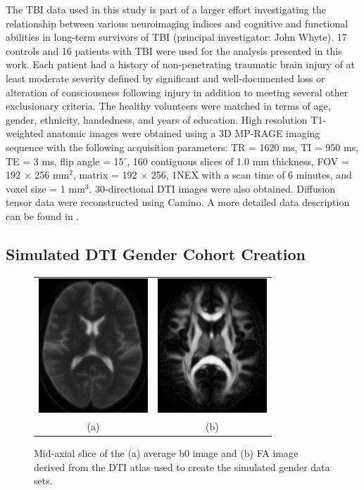 \documentclass[final,5p,times,twocolumn]{elsarticle}
\begin{document}
The TBI data used in this study is part of a larger effort investigating the relationship between various neuroimaging indices and cognitive and functional abilities in long-term survivors of TBI (principal investigator: John Whyte). 
17 controls and 16 patients with TBI were used for the analysis presented in this work.  Each patient had a history of non-penetrating traumatic brain injury 
of at least moderate severity defined by significant and well-documented
loss or alteration of consciousness following injury in addition to meeting
several other exclusionary criteria.  The healthy volunteers were matched in terms of age, gender, ethnicity, handedness, and years of education.
High resolution T1-weighted anatomic images were obtained using a 3D MP-RAGE 
imaging sequence with the following acquisition parameters: TR = 1620 ms, 
TI = 950 ms, TE = 3 ms, flip angle = 15$^\circ$, 160 contiguous slices of 
1.0 mm thickness, FOV = 192 $\times$ 256 mm$^2$, matrix = 192 $\times$ 256, 
1NEX with a scan time of 6 minutes, and voxel size = 1 mm$^3$.  30-directional
DTI images were also obtained. Diffusion tensor data were reconstructed using Camino.
A more detailed data description can be found in \cite{Avants2008}. 

\subsection{Simulated DTI Gender Cohort Creation}
\label{sec:sim}

\begin{figure}
\begin{center}
\begin{tabular}{cc}
  \includegraphics[width=41mm]{B0Average_slice85.png} & 
  \includegraphics[width=41mm]{DTIAverageFA_slice85.png} \\
  (a) & (b) 
\end{tabular}
\caption{Mid-axial slice of the (a) average b0 image and (b) FA image derived from the DTI atlas used
to create the simulated gender data sets.}
\label{fig:simulated}
\end{center}        
\end{figure}
\end{document}
